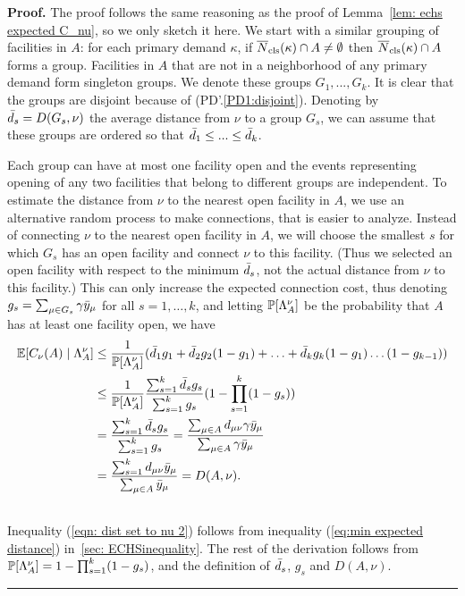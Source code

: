 \documentclass[oneside,final]{ucr}
\newenvironment{proof}[1][Proof]{\textbf{#1.} }{\ \rule{0.5em}{0.5em}}
\begin{document}
\begin{proof}
  The proof follows the same reasoning as the proof of Lemma~\ref{lem:
    echs expected C_nu}, so we only sketch it here. We start with a
  similar grouping of facilities in $A$: for each primary demand
  $\kappa$, if ${\overline{N}}_{{\mbox{\scriptsize\rm cls}}}(\kappa)\cap A\neq\emptyset$ then
  ${\overline{N}}_{{\mbox{\scriptsize\rm cls}}}(\kappa)\cap A$ forms a group. Facilities in $A$ that are
  not in a neighborhood of any primary demand form singleton groups.
  We denote these groups $G_1,...,G_k$. It is clear that the groups
  are disjoint because of (PD'.\ref{PD1:disjoint}). Denoting by
  ${\bar d}_s = D(G_s, \nu)$ the average distance from $\nu$ to a group $G_s$, we
  can assume that these groups are ordered so that ${\bar d}_1\le ... \le
  {\bar d}_k$.

  Each group can have at most one facility open and the events
  representing opening of any two facilities that belong to different
  groups are independent. To estimate the distance from $\nu$ to the
  nearest open facility in $A$, we use an alternative
  random process to make connections, that is easier to
  analyze. Instead of connecting $\nu$ to the nearest open facility in
  $A$, we will choose the smallest $s$ for which $G_s$ has an open
  facility and connect $\nu$ to this facility. (Thus we selected an
  open facility with respect to the minimum ${\bar d}_s$, not the actual
  distance from $\nu$ to this facility.)  This can only increase the
  expected connection cost, thus denoting $g_s = \sum_{\mu\in G_s}
  \gamma{\bar y}_\mu$ for all $s=1,\ldots,k$, and letting $\mathbb{P}[\Lambda^\nu_A]$
  be the probability that $A$ has at least one facility open, we have
%
\begin{align}
    \mathbb{E}[C_\nu(A) \mid \Lambda^\nu_A] &\leq \frac{1}{\mathbb{P}[\Lambda^\nu_A]} ({\bar d}_1 g_1 +
    {\bar d}_2 g_2 (1 - g_1) + \ldots + {\bar d}_k  g_k(1 -
    g_1)\ldots(1-g_{k-1}))
    \label{eqn: dist set to nu 1}
    \\
    &\leq \frac{1}{\mathbb{P}[\Lambda^\nu_A]} \frac{\sum_{s=1}^k {\bar d}_s
      g_s}{\sum_{s=1}^k  g_s} (1 - \prod_{s=1}^k (1 -  g_s))
    \label{eqn: dist set to nu 2}
    \\
    \notag
    &= \frac{\sum_{s=1}^k {\bar d}_s g_s}{\sum_{s=1}^k g_s} =
    \frac{\sum_{\mu \in A} d_{\mu\nu} \gamma {\bar y}_{\mu}}{\sum_{\mu
        \in A} \gamma {\bar y}_{\mu}}
    \\
    \notag
    &= \frac{\sum_{s=1}^k d_{\mu\nu} {\bar y}_{\mu}}{\sum_{\mu \in A}
      {\bar y}_{\mu}} = D(A, \nu).
    \\
    \notag
\end{align}
%
Inequality (\ref{eqn: dist set to nu 2}) follows from inequality
(\ref{eq:min expected distance}) in~\ref{sec: ECHSinequality}. The rest of the
derivation follows from $\mathbb{P}[\Lambda^\nu_A] = 1 - \prod_{s=1}^k (1 -
g_s)$, and the definition of ${\bar d}_s$, $g_s$ and $D(A,\nu)$.
\end{proof}
\end{document}
